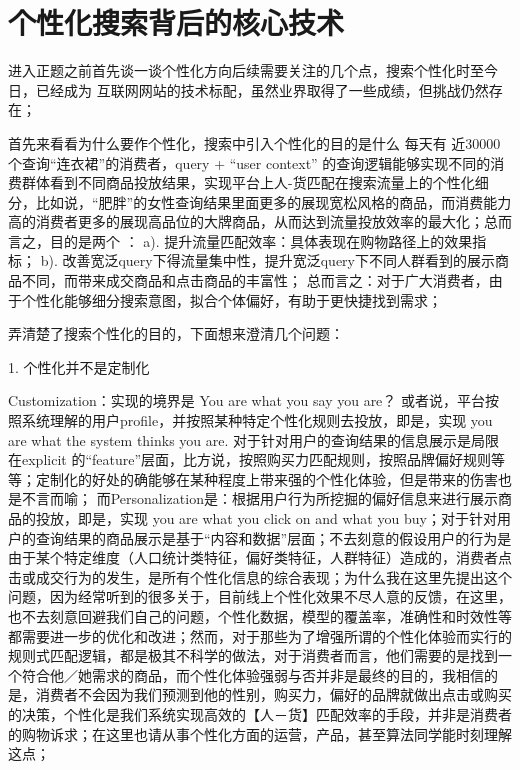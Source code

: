 
\chapter{个性化搜索背后的核心技术}
\thispagestyle{empty}

\setlength{\fboxrule}{0pt}\setlength{\fboxsep}{0cm}
\noindent\shadowbox{
\begin{tcolorbox}[arc=0mm,colback=lightblue,colframe=darkblue,title=学习目标与要求]

\end{tcolorbox}}
\setlength{\fboxrule}{1pt}\setlength{\fboxsep}{4pt} 

进入正题之前首先谈一谈个性化方向后续需要关注的几个点，搜索个性化时至今日，已经成为
互联网网站的技术标配，虽然业界取得了一些成绩，但挑战仍然存在；

首先来看看为什么要作个性化，搜索中引入个性化的目的是什么
每天有 近30000个查询“连衣裙”的消费者，query + “user context” 的查询逻辑能够实现不同的消费群体看到不同商品投放结果，实现平台上人-货匹配在搜索流量上的个性化细分，比如说，“肥胖”的女性查询结果里面更多的展现宽松风格的商品，而消费能力高的消费者更多的展现高品位的大牌商品，从而达到流量投放效率的最大化；总而言之，目的是两个 ： 
a). 提升流量匹配效率：具体表现在购物路径上的效果指标；
b). 改善宽泛query下得流量集中性，提升宽泛query下不同人群看到的展示商品不同，而带来成交商品和点击商品的丰富性；
总而言之：对于广大消费者，由于个性化能够细分搜索意图，拟合个体偏好，有助于更快捷找到需求；

弄清楚了搜索个性化的目的，下面想来澄清几个问题：

1. 个性化并不是定制化

Customization：实现的境界是 You are what you say you are？ 或者说，平台按照系统理解的用户profile，并按照某种特定个性化规则去投放，即是，实现 you are what the system thinks you are. 对于针对用户的查询结果的信息展示是局限在explicit 的“feature”层面，比方说，按照购买力匹配规则，按照品牌偏好规则等等；定制化的好处的确能够在某种程度上带来强的个性化体验，但是带来的伤害也是不言而喻；
而Personalization是：根据用户行为所挖掘的偏好信息来进行展示商品的投放，即是，实现 you are what you click on and what you buy；对于针对用户的查询结果的商品展示是基于“内容和数据”层面；不去刻意的假设用户的行为是由于某个特定维度（人口统计类特征，偏好类特征，人群特征）造成的，消费者点击或成交行为的发生，是所有个性化信息的综合表现；为什么我在这里先提出这个问题，因为经常听到的很多关于，目前线上个性化效果不尽人意的反馈，在这里，也不去刻意回避我们自己的问题，个性化数据，模型的覆盖率，准确性和时效性等都需要进一步的优化和改进；然而，对于那些为了增强所谓的个性化体验而实行的规则式匹配逻辑，都是极其不科学的做法，对于消费者而言，他们需要的是找到一个符合他／她需求的商品，而个性化体验强弱与否并非是最终的目的，我相信的是，消费者不会因为我们预测到他的性别，购买力，偏好的品牌就做出点击或购买的决策，个性化是我们系统实现高效的【人－货】匹配效率的手段，并非是消费者的购物诉求；在这里也请从事个性化方面的运营，产品，甚至算法同学能时刻理解这点；

